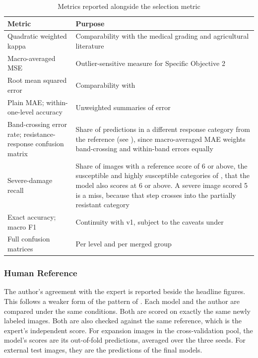 \documentclass{icsthesis}
\newcommand{\secref}[1]{\textit{\nameref{#1}}}
\begin{document}
\begin{mainmatter}
					\begin{table}[htbp]
					\vspace{4ex}
					\centering
						\caption{Metrics reported alongside the selection metric}
						\label{tab:metrics}
						\singlespacing\footnotesize
						\begin{tabular}{p{4.6cm}p{9.2cm}}
						\hline
						\hline
						Metric & Purpose \\ \hline
						Quadratic weighted kappa \citep{cohen1968} & Comparability with the medical
						grading and agricultural literature \\
						Macro-averaged MSE \citep{baccianella2009} & Outlier-sensitive measure for
						Specific Objective 2 \\
						Root mean squared error & Comparability with \citet{shi2023corn} \\
						Plain MAE; within-one-level accuracy & Unweighted summaries of error \\
						Band-crossing error rate; resistance-response confusion matrix & Share of
						predictions in a different response category from the reference (see
						\secref{sec:background}), since macro-averaged MAE weights band-crossing and
						within-band errors equally \\
						Severe-damage recall & Share of images with a reference score of 6 or above,
						the susceptible and highly susceptible categories of \citet{prasanna2018},
						that the model also scores at 6 or above. A severe image scored 5 is a miss,
						because that step crosses into the partially resistant category \\
						Exact accuracy; macro F1 & Continuity with v1, subject to the caveats under
						\secref{sec:baseline} \\
						Full confusion matrices & Per level and per merged group \\ \hline\hline
						\end{tabular}
					\vspace{4ex}
					\end{table}

				\subsubsection{Human Reference}\label{sec:humanref}

					The author's agreement with the expert is reported beside the
					headline figures. This follows a weaker form of the pattern of
					\citet{schaap2022}. Each model and the author are compared under the
					same conditions. Both are scored on exactly the same newly labeled
					images. Both are also checked against the same reference, which is
					the expert's independent score. For expansion images in the
					cross-validation pool, the model's scores are its out-of-fold
					predictions, averaged over the three seeds. For external test images,
					they are the predictions of the final models.


\end{mainmatter}
\end{document}
